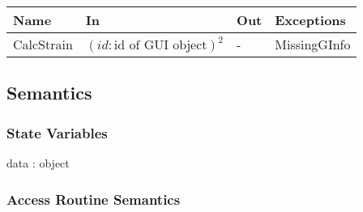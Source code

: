 \documentclass[12pt, titlepage]{article}
\begin{document}
\begin{center}
\begin{tabular}{p{2cm} p{4.5cm} p{3cm} p{2cm}}
\hline
\textbf{Name} & \textbf{In} & \textbf{Out} & \textbf{Exceptions} \\
\hline
CalcStrain & $(id:\text{id of GUI object})^{2}$  & - & MissingGInfo \\
\hline
\end{tabular}
\end{center}

\subsection{Semantics}

\subsubsection{State Variables}
data : object

\subsubsection{Access Routine Semantics}
\end{document}
